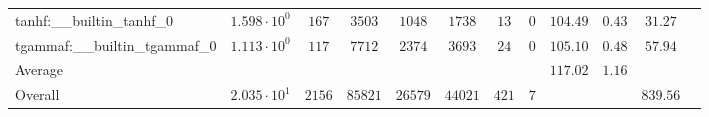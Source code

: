 \begin{tabular}{|l|c|c|c|c|c|c|c|c|c|c|c|}
tanhf:\_\_builtin\_tanhf\_0               & $ 1.598 \cdot 10^{0}  $ & $ 167    $ & $ 3503  $ & $ 1048  $ & $ 1738  $ & $ 13  $ & $ 0 $ & $ 104.49      $ & $ 0.43    $ & $ 31.27   $ \\
tgammaf:\_\_builtin\_tgammaf\_0           & $ 1.113 \cdot 10^{0}  $ & $ 117    $ & $ 7712  $ & $ 2374  $ & $ 3693  $ & $ 24  $ & $ 0 $ & $ 105.10      $ & $ 0.48    $ & $ 57.94   $ \\
\hline
Average                                   & $                     $ & $        $ & $       $ & $       $ & $       $ & $     $ & $   $ & $ 117.02      $ & $ 1.16    $ & $         $ \\
\hline
Overall                                   & $ 2.035 \cdot 10^{1}  $ & $ 2156   $ & $ 85821 $ & $ 26579 $ & $ 44021 $ & $ 421 $ & $ 7 $ & $             $ & $         $ & $ 839.56  $ \\
\hline
\end{tabular}
